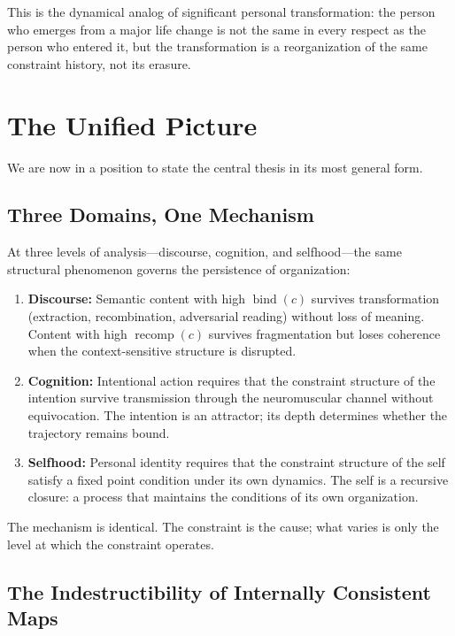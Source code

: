 \documentclass[11pt]{article}
\newcommand{\bind}{\operatorname{bind}}
\newcommand{\recomp}{\operatorname{recomp}}
\begin{document}
This is the dynamical analog of significant personal transformation: the person who
emerges from a major life change is not the same in every respect as the person who
entered it, but the transformation is a reorganization of the same constraint history,
not its erasure.

\section{The Unified Picture}

We are now in a position to state the central thesis in its most general form.

\subsection{Three Domains, One Mechanism}

At three levels of analysis—discourse, cognition, and selfhood—the same structural
phenomenon governs the persistence of organization:

\begin{enumerate}
  \item \textbf{Discourse:} Semantic content with high $\bind(c)$ survives transformation
        (extraction, recombination, adversarial reading) without loss of meaning. Content
        with high $\recomp(c)$ survives fragmentation but loses coherence when the
        context-sensitive structure is disrupted.

  \item \textbf{Cognition:} Intentional action requires that the constraint structure of
        the intention survive transmission through the neuromuscular channel without
        equivocation. The intention is an attractor; its depth determines whether the
        trajectory remains bound.

  \item \textbf{Selfhood:} Personal identity requires that the constraint structure of
        the self satisfy a fixed point condition under its own dynamics. The self is a
        recursive closure: a process that maintains the conditions of its own organization.
\end{enumerate}

The mechanism is identical. The constraint is the cause; what varies is only the level
at which the constraint operates.

\subsection{The Indestructibility of Internally Consistent Maps}
\end{document}
